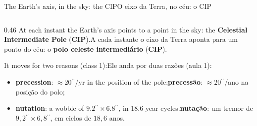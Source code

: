 \documentclass[aspectratio=169,11pt]{beamer}
\newcommand{\tr}[2]{\ifEN#2\else#1\fi}
\newcommand{\bnum}[1]{\textbf{\textcolor{mTeal}{#1}}}
\newcommand{\asec}{\ensuremath{{}^{\prime\prime}}}
\begin{document}
\begin{frame}{\tr{O eixo da Terra, no céu: o CIP}{The Earth's axis, in the sky: the CIP}}
  \begin{columns}[T]
    \begin{column}{0.46\textwidth}
      \small
      \tr{A cada instante o eixo da Terra aponta para um ponto do céu: o \bnum{polo celeste intermediário} (\bnum{CIP}).}{At each instant the Earth's axis points to a point in the sky: the \bnum{Celestial Intermediate Pole} (\bnum{CIP}).}
      \medskip

      \tr{Ele anda por duas razões (aula 1):}{It moves for two reasons (class 1):}
      \begin{itemize}
        \setlength{\itemsep}{1pt}
        \item \tr{\bnum{precessão}: $\approx 20\asec$/ano na posição do polo;}{\bnum{precession}: $\approx 20\asec$/yr in the position of the pole;}
        \item \tr{\bnum{nutação}: um tremor de $9{,}2\asec \times 6{,}8\asec$, em ciclos de $18{,}6$ anos.}{\bnum{nutation}: a wobble of $9.2\asec \times 6.8\asec$, in $18.6$-year cycles.}
      \end{itemize}
      \medskip


\end{column}
\end{columns}
\end{frame}
\end{document}
